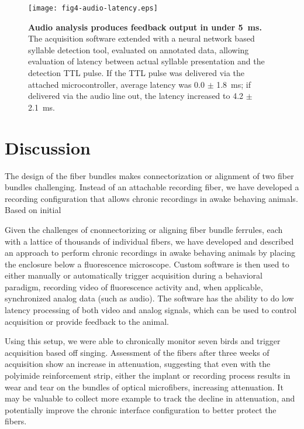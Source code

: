 \begin{figure}
\texttt{[image: fig4-audio-latency.eps]}
\caption[Latency for audio processing]{\textbf{Audio analysis 
produces feedback output in under 5~ms.} The acquisition 
software extended with a neural network based syllable detection 
tool, evaluated on annotated data, allowing evaluation of 
latency between actual syllable presentation and the detection 
TTL pulse. If the TTL pulse was delivered via the attached 
microcontroller, average latency was 0.0 $\pm$ 1.8~ms; if 
delivered via the audio line out, the latency increased to 
4.2 $\pm$ 2.1~ms.}
\label{fig:audio-latency}
\end{figure}

\section{Discussion}

The design of the fiber bundles makes connectorization or 
alignment of two fiber bundles challenging. Instead of an 
attachable recording fiber, we have developed a recording 
configuration that allows chronic recordings in awake 
behaving animals. Based on initial 

Given the challenges of cnonnectorizing or aligning fiber 
bundle ferrules, each with a lattice of thousands of individual 
fibers, we have developed and described an approach to 
perform chronic recordings in awake behaving animals by 
placing the enclosure below a fluorescence microscope. 
Custom software is then used to either manually or 
automatically trigger acquisition during a behavioral 
paradigm, recording video of fluorescence activity and, 
when applicable, synchronized analog data (such as audio).
The software has the ability to do low latency processing 
of both video and analog signals, which can be used to 
control acquisition or provide feedback to the animal.

Using this setup, we were able to chronically monitor 
seven birds and trigger acquisition based off singing. 
Assessment of the fibers after three weeks of acquisition 
show an increase in attenuation, suggesting that even 
with the polyimide reinforcement strip, either the implant 
or recording process results in wear and tear on the 
bundles of optical microfibers, increasing attenuation. 
It may be valuable to collect more example to track 
the decline in attenuation, and potentially improve 
the chronic interface configuration to better protect 
the fibers.

